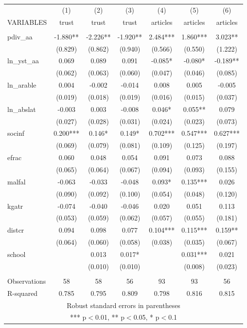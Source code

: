 \documentclass[]{article}
\begin{document}
\begin{tabular}{lcccccc} \hline
 & (1) & (2) & (3) & (4) & (5) & (6) \\
VARIABLES & trust & trust & trust & articles & articles & articles \\ \hline
 &  &  &  &  &  &  \\
pdiv\_aa & -1.880** & -2.226** & -1.920** & 2.484*** & 1.860*** & 3.023** \\
 & (0.829) & (0.862) & (0.940) & (0.566) & (0.550) & (1.222) \\
ln\_yst\_aa & 0.069 & 0.089 & 0.091 & -0.085* & -0.080* & -0.189** \\
 & (0.062) & (0.063) & (0.060) & (0.047) & (0.046) & (0.085) \\
ln\_arable & 0.004 & -0.002 & -0.014 & 0.008 & 0.005 & -0.005 \\
 & (0.019) & (0.018) & (0.019) & (0.016) & (0.015) & (0.037) \\
ln\_abslat & -0.003 & 0.003 & -0.008 & 0.046* & 0.055** & 0.079 \\
 & (0.027) & (0.028) & (0.031) & (0.024) & (0.023) & (0.073) \\
socinf & 0.200*** & 0.146* & 0.149* & 0.702*** & 0.547*** & 0.627*** \\
 & (0.069) & (0.079) & (0.081) & (0.109) & (0.125) & (0.197) \\
efrac & 0.060 & 0.048 & 0.054 & 0.091 & 0.073 & 0.088 \\
 & (0.065) & (0.064) & (0.067) & (0.094) & (0.093) & (0.155) \\
malfal & -0.063 & -0.033 & -0.048 & 0.093* & 0.135*** & 0.026 \\
 & (0.090) & (0.092) & (0.100) & (0.054) & (0.048) & (0.120) \\
kgatr & -0.074 & -0.040 & -0.046 & 0.020 & 0.051 & 0.113 \\
 & (0.053) & (0.059) & (0.062) & (0.057) & (0.055) & (0.181) \\
distcr & 0.094 & 0.098 & 0.077 & 0.104*** & 0.115*** & 0.159** \\
 & (0.064) & (0.060) & (0.058) & (0.038) & (0.035) & (0.067) \\
school &  & 0.013 & 0.017* &  & 0.031*** & 0.021 \\
 &  & (0.010) & (0.010) &  & (0.008) & (0.023) \\
 &  &  &  &  &  &  \\
Observations & 58 & 58 & 56 & 93 & 93 & 56 \\
 R-squared & 0.785 & 0.795 & 0.809 & 0.798 & 0.816 & 0.815 \\ \hline
\multicolumn{7}{c}{ Robust standard errors in parentheses} \\
\multicolumn{7}{c}{ *** p$<$0.01, ** p$<$0.05, * p$<$0.1} \\
\end{tabular}
\end{document}
